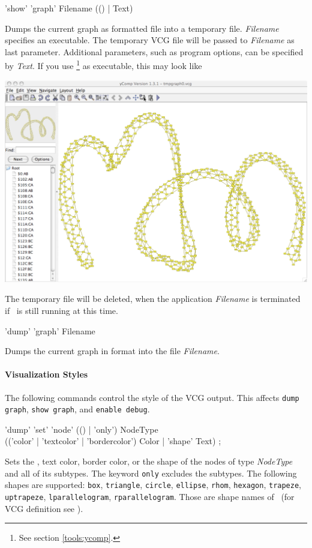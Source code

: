 \begin{rail}
  'show' 'graph' Filename (() | Text)
\end{rail}
Dumps the current graph as  formatted file into a temporary file. \emph{Filename} specifies an executable. The temporary VCG file will be passed to \emph{Filename} as last parameter. Additional parameters, such as program options, can be specified by \emph{Text}. If you use \yComp\footnote{See section \ref{tools:ycomp}.} as executable, this may look like
\begin{center}
  \includegraphics[width=0.75\linewidth]{fig/showgraph}
\end{center}  
The temporary file will be deleted, when the application \emph{Filename} is terminated if \GrShell\ is still running at this time.

\begin{rail}
  'dump' 'graph' Filename
\end{rail}
Dumps the current graph in  format into the file \emph{Filename}.\\

\paragraph{Visualization Styles}
The following commands control the style of the VCG output. This affects \texttt{dump graph}, \texttt{show graph}, and \texttt{enable debug}. 
\begin{rail}
  'dump' 'set' 'node' (() | 'only') NodeType \\ (('color' | 'textcolor' | 'bordercolor') Color | 'shape' Text) ;
\end{rail}
Sets the , text color, border color, or the shape of the nodes of type \emph{NodeType} and all of its subtypes. The keyword \texttt{only} excludes the subtypes. The following shapes are supported: \texttt{box}, \texttt{triangle}, \texttt{circle}, \texttt{ellipse}, \texttt{rhom}, \texttt{hexagon}, \texttt{trapeze}, \texttt{uptrapeze}, \texttt{lparallelogram}, \texttt{rparallelogram}. Those are shape names of \yComp\ (for VCG definition see \cite{vcg}).

